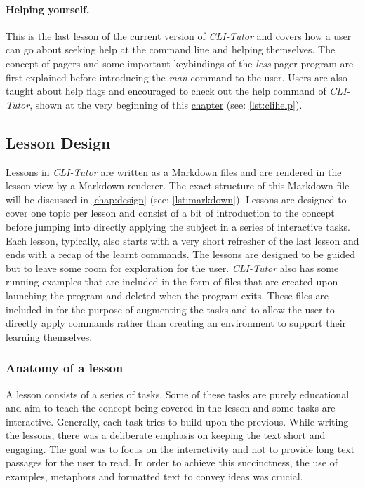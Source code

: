 \paragraph{Helping yourself.} This is the last lesson of the current version of
\textit{CLI-Tutor} and covers how a user can go about seeking help at the
command line and helping themselves. The concept of pagers and some important
keybindings of the \textit{less} pager program are first explained before
introducing the \textit{man} command to the user. Users are also taught about
help flags and encouraged to check out the help command of \textit{CLI-Tutor},
shown at the very beginning of this \hyperref[chap:clitutor]{chapter} (see:
\autoref{lst:clihelp}).

\subsection{Lesson Design} Lessons in \textit{CLI-Tutor} are written as a
Markdown files and are rendered in the lesson view by a Markdown renderer. The
exact structure of this Markdown file will be discussed in
\autoref{chap:design} (see: \autoref{lst:markdown}). Lessons are designed to
cover one topic per lesson and  consist of a bit of introduction to the concept
before jumping into directly applying the subject in a series of interactive
tasks. Each lesson, typically, also starts with a very short refresher of the
last lesson and ends with a recap of the learnt commands. The lessons are
designed to be guided but to leave some room for exploration for the user.
\textit{CLI-Tutor} also has some running examples that are included in the form
of files that are created upon launching the program and deleted when the
program exits. These files are included in for the purpose of augmenting the
tasks and to allow the user to directly apply commands rather than creating an
environment to support their learning themselves.

\subsubsection{Anatomy of a lesson} A lesson consists of a series of tasks.
Some of these tasks are purely educational and aim to teach the concept being
covered in the lesson and some tasks are interactive. Generally, each
task tries to build upon the previous. While writing the lessons, there was a
deliberate emphasis on keeping the text short and engaging. The goal was to
focus on the interactivity and not to provide long text passages for the user
to read. In order to achieve this succinctness, the use of examples, metaphors
and formatted text to convey ideas was crucial.

